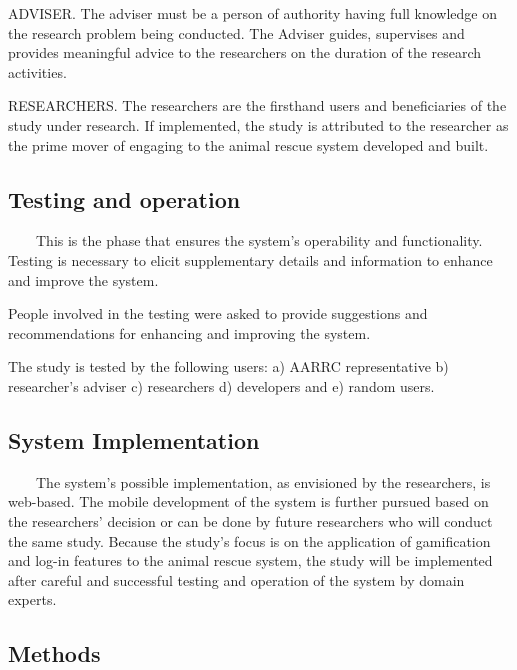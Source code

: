 ADVISER. The adviser must be a person of authority having full knowledge on the research problem being conducted. The Adviser guides, supervises and provides meaningful advice to the researchers on the duration of the research activities.

RESEARCHERS. The researchers are the firsthand users and beneficiaries of the study under research. If implemented, the study is attributed to the researcher as the prime mover of engaging to the animal rescue system developed and built. 

\subsection{Testing and operation}

~~~~This is the phase that ensures the system's operability and functionality. Testing is necessary to elicit supplementary details and information to enhance and improve the system. 

People involved in the testing were asked to provide suggestions and recommendations for enhancing and improving the system.

The study is tested by the following users: a) AARRC representative b) researcher’s adviser c) researchers d) developers and e) random users.

\subsection{System Implementation}

~~~~The system's possible implementation, as envisioned by the researchers, is web-based. The mobile development of the system is further pursued based on the researchers' decision or can be done by future researchers who will conduct the same study. Because the study's focus is on the application of gamification and log-in features to the animal rescue system, the study will be implemented after careful and successful testing and operation of the system by domain experts.

\subsection{Methods}
